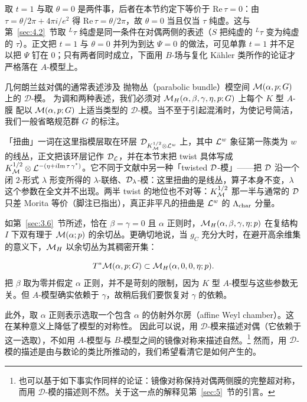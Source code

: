 \begin{yizhu}[易错点]
取 $t=1$ 与取 $\theta=0$ 是两件事，后者在本节约定下等价于 $\mathrm{Re}\,\tau=0$：由 $\tau=\theta/2\pi+4\pi i/e^2$ 得 $\mathrm{Re}\,\tau=\theta/2\pi$，故 $\theta=0$ 当且仅当 $\tau$ 纯虚。这与第~\ref{sec:4.2}~节取 $^L\tau$ 纯虚是同一条件在对偶两侧的表述（$S$ 把纯虚的 $^L\tau$ 变为纯虚的 $\tau$）。正文把 $t=1$ 与 $\theta=0$ 并列为到达 $\Psi=0$ 的做法，可见单靠 $t=1$ 并不足以把 $\Psi$ 钉在 $0$；只有两者同时成立，下面用 $B$-场与复化 Kähler 类所作的论证才严格落在 $A$-模型上。
\end{yizhu}

几何朗兰兹对偶的通常表述涉及
抛物丛（parabolic bundle）模空间 ${\mathcal{M}}(\alpha,p;G)$ 上的 ${\mathcal D}$-模。
为调和两种表述，我们必须对 ${{\mathcal{M}}_H}(\alpha,\beta,\gamma,\eta,p;G)$ 上每个 $K$ 型 $A$-膜
配以 ${\mathcal{M}}(\alpha,p;G)$ 上适当类型的 ${\mathcal
D}$-模。当不至于引起混淆时，为使记号简洁，我们一般省略规范群 $G$ 的标注。

\begin{yizhu}[易错点]
「扭曲」一词在这里指模层取在环层 ${\mathcal D}_{K_{\mathcal{M}}^{1/2}\otimes{\mathcal L}^w}$ 上，其中 ${\mathcal L}^w$ 象征第一陈类为 $w$ 的线丛，正文把该环层记作 ${\mathcal D}_{\mathcal L}$，并在本节末把 twist 具体写成 $K_{\mathcal{M}}^{1/2}\otimes{\mathcal L}^{-(\eta+i{\rm Im}\,\tau\,\gamma^*)}$。它不同于文献中另一种「twisted ${\mathcal D}$-模」——把 ${\mathcal D}$ 沿一个闭 $2$-形式 $\lambda$ 形变所得的 $\lambda$-联络、${\mathcal D}_\lambda$-模：这里扭曲的是线丛，算子本身不变，$\lambda$ 这个参数在全文并不出现。两半 twist 的地位也不对等：$K_{\mathcal{M}}^{1/2}$ 那一半与通常的 ${\mathcal D}$ 只差 Morita 等价（脚注已指出），真正非平凡的扭曲是 ${\mathcal L}^w$ 的 $\Lambda_{\rm char}$ 分量。
\end{yizhu}

如第~\ref{sec:3.6}~节所述，恰在 $\beta=\gamma=0$ 且
$\alpha$ 正则时，${{\mathcal{M}}_H}(\alpha,\beta,\gamma,\eta;p)$ 在复结构 $I$ 下双有理于
${\mathcal{M}}(\alpha;p)$ 的余切丛。更确切地说，当 $g_C$ 充分大时，在避开高余维集的意义下，${{\mathcal{M}}_H}$ 以余切丛为其稠密开集：

\setcounter{equation}{8}
\begin{equation}\label{eq:4.9}
  T^*{\mathcal{M}}(\alpha,p;G)\subset{{\mathcal{M}}_H}(\alpha,0,0,\eta;p).
\end{equation}
把
$\beta$ 取为零并假定 $\alpha$ 正则，并不是苛刻的限制，因为 $K$ 型 $A$-模型与这些参数无关。但 $A$-模型确实依赖于 $\gamma$，故稍后我们要恢复对 $\gamma$ 的依赖。

此外，取 $\alpha$ 正则表示选取一个包含 $\alpha$ 的仿射外尔房（affine Weyl chamber）。这在某种意义上降低了模型的对称性。
因此可以说，用 ${\mathcal D}$-模来描述对偶（它依赖于这一选取），不如用 $A$-模型与 $B$-模型之间的镜像对称来描述自然。\footnote{也可以基于如下事实作同样的论证：镜像对称保持对偶两侧膜的完整超对称，而用 ${\mathcal D}$-模的描述则不然。关于这一点的解释见第~\ref{sec:5}~节的引言。} 然而，用 ${\mathcal D}$-模的描述是由与数论的类比所推动的，我们希望看清它是如何产生的。

